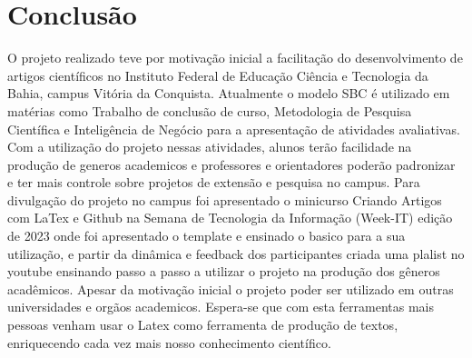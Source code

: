 \section{Conclusão}

O projeto realizado teve por motivação inicial a facilitação do desenvolvimento de artigos científicos no Instituto Federal de Educação Ciência e Tecnologia da Bahia, campus Vitória da Conquista. Atualmente o modelo SBC é utilizado em matérias como Trabalho de conclusão de curso, Metodologia de Pesquisa Científica e Inteligência de Negócio para a apresentação de atividades avaliativas. Com a utilização do projeto nessas atividades, alunos terão facilidade na produção de generos academicos e professores e orientadores poderão padronizar e ter mais controle sobre projetos de extensão e pesquisa no campus.
Para divulgação do projeto no campus foi apresentado o minicurso Criando Artigos com LaTex e Github na Semana de Tecnologia da Informação (Week-IT) edição de 2023 onde foi apresentado o template e ensinado o basico para a sua utilização, e partir da dinâmica e feedback dos participantes criada uma plalist no youtube ensinando passo a passo a utilizar o projeto na produção dos gêneros acadêmicos.
Apesar da motivação inicial o projeto poder ser utilizado em outras universidades e orgãos academicos. Espera-se que com esta ferramentas mais pessoas venham usar o Latex como ferramenta de produção de textos, enriquecendo cada vez mais nosso conhecimento científico.